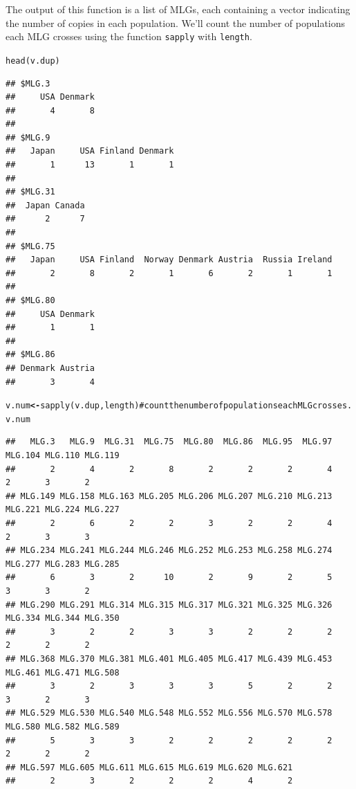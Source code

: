 \documentclass[letterpaper]{article}\usepackage[]{graphicx}\usepackage[]{color}
\makeatletter
\newcommand{\hlcom}[1]{\textcolor[rgb]{1,0.502,0}{#1}}%
\newcommand{\hlstd}[1]{\textcolor[rgb]{0,0,0}{#1}}%
\newcommand{\hlkwb}[1]{\textcolor[rgb]{0.502,0.502,0.753}{\textbf{#1}}}%
\newcommand{\hlkwd}[1]{\textcolor[rgb]{0,0.267,0.4}{#1}}%
\newenvironment{kframe}{%
 \def\at@end@of@kframe{}%
 \ifinner\ifhmode%
  \def\at@end@of@kframe{\end{minipage}}%
  \begin{minipage}{\columnwidth}%
 \fi\fi%
 \def\FrameCommand##1{\hskip\@totalleftmargin \hskip-\fboxsep
 \colorbox{shadecolor}{##1}\hskip-\fboxsep
     \hskip-\linewidth \hskip-\@totalleftmargin \hskip\columnwidth}%
 \MakeFramed {\advance\hsize-\width
   \@totalleftmargin\z@ \linewidth\hsize
   \@setminipage}}%
 {\par\unskip\endMakeFramed%
 \at@end@of@kframe}
\newenvironment{knitrout}{}{} %
\makeatother
\begin{document}
The output of this function is a list of MLGs, each containing a vector indicating the number of copies in each population. We'll count the number of populations each MLG crosses using the function \texttt{sapply} with \texttt{length}.
\begin{knitrout}\footnotesize
{}\color{fgcolor}\begin{kframe}
\begin{alltt}
\hlkwd{head}\hlstd{(v.dup)}
\end{alltt}
\begin{verbatim}
## $MLG.3
##     USA Denmark 
##       4       8 
## 
## $MLG.9
##   Japan     USA Finland Denmark 
##       1      13       1       1 
## 
## $MLG.31
##  Japan Canada 
##      2      7 
## 
## $MLG.75
##   Japan     USA Finland  Norway Denmark Austria  Russia Ireland 
##       2       8       2       1       6       2       1       1 
## 
## $MLG.80
##     USA Denmark 
##       1       1 
## 
## $MLG.86
## Denmark Austria 
##       3       4
\end{verbatim}
\begin{alltt}
\hlstd{v.num} \hlkwb{<-} \hlkwd{sapply}\hlstd{(v.dup, length)}  \hlcom{# count the number of populations each MLG crosses.}
\hlstd{v.num}
\end{alltt}
\begin{verbatim}
##   MLG.3   MLG.9  MLG.31  MLG.75  MLG.80  MLG.86  MLG.95  MLG.97 MLG.104 MLG.110 MLG.119 
##       2       4       2       8       2       2       2       4       2       3       2 
## MLG.149 MLG.158 MLG.163 MLG.205 MLG.206 MLG.207 MLG.210 MLG.213 MLG.221 MLG.224 MLG.227 
##       2       6       2       2       3       2       2       4       2       3       3 
## MLG.234 MLG.241 MLG.244 MLG.246 MLG.252 MLG.253 MLG.258 MLG.274 MLG.277 MLG.283 MLG.285 
##       6       3       2      10       2       9       2       5       3       3       2 
## MLG.290 MLG.291 MLG.314 MLG.315 MLG.317 MLG.321 MLG.325 MLG.326 MLG.334 MLG.344 MLG.350 
##       3       2       2       3       3       2       2       2       2       2       2 
## MLG.368 MLG.370 MLG.381 MLG.401 MLG.405 MLG.417 MLG.439 MLG.453 MLG.461 MLG.471 MLG.508 
##       3       2       3       3       3       5       2       2       3       2       3 
## MLG.529 MLG.530 MLG.540 MLG.548 MLG.552 MLG.556 MLG.570 MLG.578 MLG.580 MLG.582 MLG.589 
##       5       3       3       2       2       2       2       2       2       2       2 
## MLG.597 MLG.605 MLG.611 MLG.615 MLG.619 MLG.620 MLG.621 
##       2       3       2       2       2       4       2
\end{verbatim}
\end{kframe}
\end{knitrout}
\end{document}
